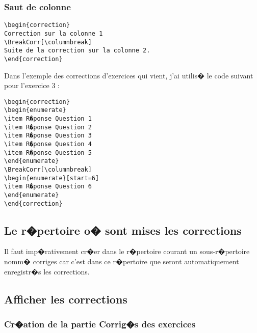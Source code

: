 \documentclass[ams,openany,10pt,presentation,latin1]{mathbook}
\begin{document}
\subsubsection{Saut de colonne}

\begin{lstlisting}
\begin{correction}
Correction sur la colonne 1
\BreakCorr[\columnbreak]
Suite de la correction sur la colonne 2.
\end{correction}
\end{lstlisting}

Dans l'exemple des corrections d'exercices qui vient, j'ai utilis� le code suivant pour l'exercice 3 :

\begin{lstlisting}
\begin{correction}
\begin{enumerate}
\item R�ponse Question 1
\item R�ponse Question 2
\item R�ponse Question 3
\item R�ponse Question 4
\item R�ponse Question 5
\end{enumerate}
\BreakCorr[\columnbreak]
\begin{enumerate}[start=6]
\item R�ponse Question 6
\end{enumerate}
\end{correction}
\end{lstlisting}

\newpage

\subsection{Le r�pertoire o� sont mises les corrections}

Il faut imp�rativement cr�er dans le r�pertoire courant un sous-r�pertoire nomm� \og corriges \fg{} car c'est dans ce r�pertoire que seront automatiquement enregistr�s les corrections.

\subsection{Afficher les corrections}

\subsubsection{Cr�ation de la partie \og Corrig�s des exercices \fg}
\end{document}
